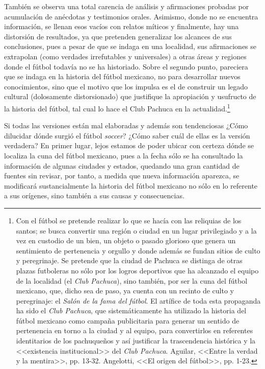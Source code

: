 \documentclass[11pt,a5paper,twoside]{book} %
\begin{document}
También se observa una total carencia de análisis y afirmaciones probadas por
acumulación de anécdotas y testimonios orales. Asimismo, donde no se encuentra
información, se llenan esos vacíos con relatos míticos y finalmente, hay una distorsión de
resultados, ya que pretenden generalizar los alcances de sus conclusiones, pues a pesar de
que se indaga en una localidad, sus afirmaciones se extrapolan (como verdades irrefutables
y universales) a otras áreas y regiones donde el fútbol todavía no se ha historiado. Sobre el segundo punto, pareciera que se indaga en la historia del fútbol mexicano, no para desarrollar
nuevos conocimientos, sino que el motivo que los impulsa es el de construir un legado
cultural (dolosamente distorsionado) que justifique la apropiación y usufructo de la historia
del fútbol, tal cual lo hace el Club Pachuca en la actualidad.\footnote{Con el fútbol se pretende realizar lo que se hacía con las reliquias de los santos; se busca convertir una región o ciudad en un lugar privilegiado y a la vez en custodio de un bien, un objeto o pasado glorioso que genera un sentimiento de pertenencia y orgullo y donde además se fundan sitios de culto y peregrinaje. Se pretende que la ciudad de Pachuca se distinga de otras plazas futboleras no sólo por los logros deportivos que ha alcanzado el equipo de la localidad (el \emph{Club Pachuca}), sino también, por ser la cuna del fútbol mexicano, que, dicho sea de paso, ya cuenta con un recinto de culto y peregrinaje: el \emph{Salón de la fama del fútbol}. El artífice de toda esta propaganda ha sido el \emph{Club Pachuca}, que sistemáticamente ha utilizado la historia del fútbol mexicano como campaña publicitaria para generar un sentido de pertenencia en torno a la ciudad y al equipo, para convertirlos en referentes identitarios de los pachuqueños y así justificar la trascendencia histórica y la <<existencia institucional>> del \emph{Club Pachuca}. Aguilar, <<Entre la verdad y la mentira>>, pp. 13-32. Angelotti, <<El origen del fútbol>>, pp. 1-23.}

Si todas las versiones están mal elaboradas y además son tendenciosas ¿Cómo
dilucidar dónde surgió el fútbol \emph{soccer}? ¿Cómo saber cuál de ellas es la versión verdadera?
En primer lugar, lejos estamos de poder ubicar con certeza dónde se localiza la cuna del
fútbol mexicano, pues a la fecha sólo se ha consultado la información de algunas ciudades y
estados, quedando una gran cantidad de fuentes sin revisar, por tanto, a medida que nueva
información aparezca, se modificará sustancialmente la historia del fútbol mexicano no sólo
en lo referente a sus orígenes, sino también a sus causas y consecuencias.
\end{document}
